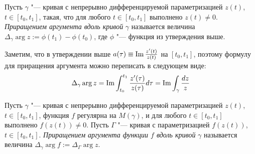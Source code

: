 \begin{definition}
	Пусть $\gamma$ "--- кривая с непрерывно дифференцируемой параметризацией $z(t)$, $t \in [t_0, t_1]$, такая, что для любого $t \in [t_0, t_1]$ выполнено $z(t) \ne 0$. \textit{Приращением аргумента вдоль кривой} $\gamma$ называется величина $\Delta_\gamma\arg{z} := \phi(t_1) - \phi(t_0)$, где $\phi$ "--- функция из утверждения выше.
\end{definition}

\begin{note}
	Заметим, что в утверждении выше $a(\tau) \equiv \operatorname{Im}\frac{z'(t)}{z(t)}$ на $[t_0, t_1]$, поэтому формулу для приращения аргумента можно переписать в следующем виде:
	\[\Delta_\gamma \arg{z} = \operatorname{Im}\int_{t_0}^{t_1}\frac{z'(\tau)}{z(\tau)}d\tau = \operatorname{Im}\int_\gamma \frac{dz}{z}\]
\end{note}

\begin{definition}
	Пусть $\gamma$ "--- кривая с непрерывно дифференцируемой параметризацией $z(t)$, $t \in [t_0, t_1]$, функция $f$ регулярна на $M(\gamma)$, и для любого $t \in [t_0, t_1]$ выполнено $f(z(t)) \ne 0$. Пусть $\Gamma$ "--- кривая с параметризацией $f(z(t))$, $t \in [t_0, t_1]$. \textit{Приращением аргумента функции $f$ вдоль кривой} $\gamma$ называется величина $\Delta_\gamma\arg{f} := \Delta_\Gamma\arg{z}$.
\end{definition}


